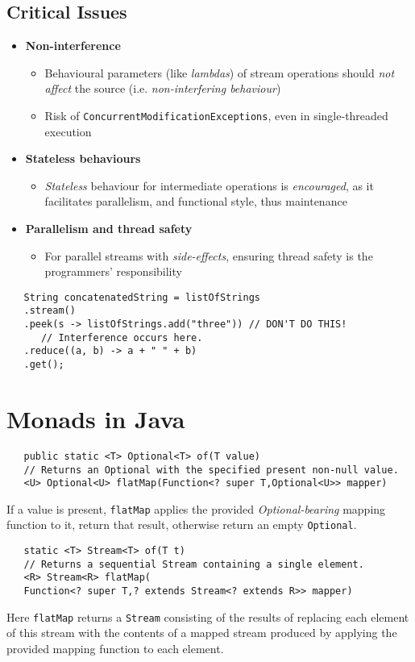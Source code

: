 \subsection{Critical Issues}
\begin{itemize}
   \item \textbf{Non-interference}
   \begin{itemize}
      \item Behavioural parameters (like \textit{lambdas}) of stream
      operations should \textit{not affect} the source (i.e. \textit{non-interfering behaviour})
      \item Risk of \lstinline|ConcurrentModificationExceptions|, even in
      single-threaded execution
   \end{itemize}
   \item \textbf{Stateless behaviours}
   \begin{itemize}
      \item \textit{Stateless} behaviour for intermediate operations is
      \textit{encouraged}, as it facilitates parallelism, and functional
      style, thus maintenance
   \end{itemize}
   \item \textbf{Parallelism and thread safety}
   \begin{itemize}
      \item For parallel streams with \textit{side-effects},
      ensuring thread safety is the programmers’ responsibility
   \end{itemize}
\end{itemize}

\begin{lstlisting}
   String concatenatedString = listOfStrings
   .stream()
   .peek(s -> listOfStrings.add("three")) // DON'T DO THIS!
      // Interference occurs here.
   .reduce((a, b) -> a + " " + b)
   .get();
\end{lstlisting}

\section{Monads in Java}
\begin{lstlisting}
   public static <T> Optional<T> of(T value)
   // Returns an Optional with the specified present non-null value.
   <U> Optional<U> flatMap(Function<? super T,Optional<U>> mapper)
\end{lstlisting}
If a value is present, \lstinline|flatMap| applies the provided \textit{Optional-bearing} mapping
function to it, return that result, otherwise return an empty
\lstinline|Optional|.

\begin{lstlisting}
   static <T> Stream<T> of(T t)
   // Returns a sequential Stream containing a single element.
   <R> Stream<R> flatMap(
   Function<? super T,? extends Stream<? extends R>> mapper)
\end{lstlisting}
Here \lstinline|flatMap| returns a \lstinline|Stream| consisting of the results of replacing each element
of this stream with the contents of a mapped stream produced by applying
the provided mapping function to each element.